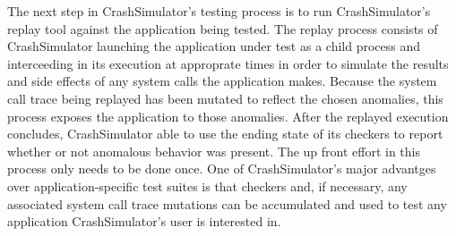 
    The next step in CrashSimulator's testing process is to run CrashSimulator's
    replay tool against the application being tested.  The replay process
    consists of CrashSimulator launching the application under test as a child
    process and interceeding in its execution at approprate times in order to
    simulate the results and side effects of any system calls the application
    makes.  Because the system call trace being replayed has been mutated to
    reflect the chosen anomalies, this process exposes the application to those
    anomalies. After the replayed execution concludes, CrashSimulator able to
    use the ending state of its checkers to report whether or not anomalous
    behavior was present.  The up front effort in this process only needs to be
    done once. One of CrashSimulator's major advantges over application-specific
    test suites is that checkers and, if necessary, any associated system call
    trace mutations can be accumulated and used to test any application
    CrashSimulator's user is interested in.




